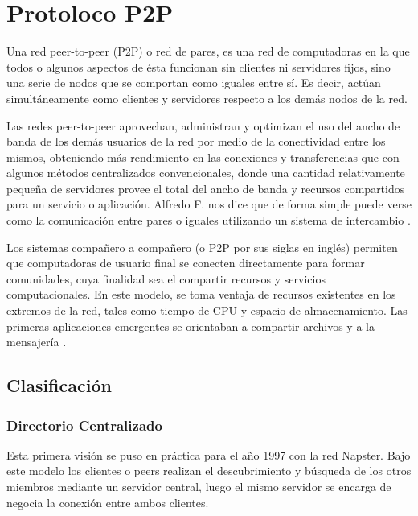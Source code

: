 
\chapter{Protoloco P2P} %

\label{ch:protocolo_p2p} %

Una red peer-to-peer (P2P) o red de pares, es una red de computadoras en la que todos o algunos aspectos de ésta funcionan sin clientes ni servidores fijos, sino una serie de nodos que se comportan como iguales entre sí. Es decir, actúan simultáneamente como clientes y servidores respecto a los demás nodos de la red.\cite{wiki_p2p}

Las redes peer-to-peer aprovechan, administran y optimizan el uso del ancho de banda de los demás usuarios de la red por medio de la conectividad entre los mismos, obteniendo más rendimiento en las conexiones y transferencias que con algunos métodos centralizados convencionales, donde una cantidad relativamente pequeña de servidores provee el total del ancho de banda y recursos compartidos para un servicio o aplicación.
Alfredo F. nos dice que de forma simple puede verse como la comunicación entre pares o iguales utilizando un sistema de intercambio \cite{bordignon:2005}.

Los sistemas compañero a compañero (o P2P por sus siglas en inglés) permiten que computadoras de usuario final se conecten directamente para formar comunidades, cuya finalidad sea el compartir recursos y servicios computacionales. En este modelo, se toma ventaja de recursos existentes en los extremos de la red, tales como tiempo de CPU y espacio de almacenamiento. Las primeras aplicaciones  emergentes se orientaban a compartir archivos y a la mensajería \cite{bordignon:2005}.



\section{Clasificación}

\subsection{Directorio Centralizado}

Esta primera visión se puso en práctica para el año 1997 con la red Napster. Bajo este modelo los clientes o peers realizan el descubrimiento y búsqueda de los otros miembros mediante un servidor central, luego el mismo servidor se encarga de negocia la conexión entre ambos clientes.

